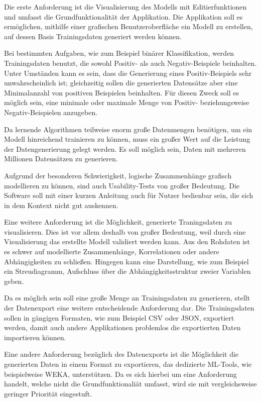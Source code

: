 Die erste Anforderung ist die Visualisierung des Modells mit Editierfunktionen und umfasst die Grundfunktionalität der Applikation. Die Applikation soll es ermöglichen, mithilfe einer grafischen Benutzeroberfläche ein Modell zu erstellen, auf dessen Basis Trainingsdaten generiert werden können.

Bei bestimmten Aufgaben, wie zum Beispiel binärer Klassifikation, werden Trainingsdaten benutzt, die sowohl Positiv- als auch Negativ-Beispiele beinhalten. Unter Umständen kann es sein, dass die Generierung eines Positiv-Beispiels sehr unwahrscheinlich ist; gleichzeitig sollen die generierten Datensätze aber eine Minimalanzahl von positiven Beispielen beinhalten. Für diesen Zweck soll es möglich sein, eine minimale oder maximale Menge von Positiv- beziehungsweise Negativ-Beispielen anzugeben.

Da lernende Algorithmen teilweise enorm große Datenmengen benötigen, um ein Modell hinreichend trainieren zu können, muss ein großer Wert auf die Leistung der Datengenerierung gelegt werden. Es soll möglich sein, Daten mit mehreren Millionen Datensätzen zu generieren.

Aufgrund der besonderen Schwierigkeit, logische Zusammenhänge grafisch modellieren zu können, sind auch Usability-Tests von großer Bedeutung. Die Software soll mit einer kurzen Anleitung auch für Nutzer bedienbar sein, die sich in dem Kontext nicht gut auskennen.

Eine weitere Anforderung ist die Möglichkeit, generierte Traningsdaten zu visualisieren. Dies ist vor allem deshalb von großer Bedeutung, weil durch eine Visualisierung das erstellte Modell validiert werden kann. Aus den Rohdaten ist es schwer auf modellierte Zusammenhänge, Korrelationen oder andere Abhängigkeiten zu schließen. Hingegen kann eine Darstellung, wie zum Beispiel ein Streudiagramm, Aufschluss über die Abhängigkeitsstruktur zweier Variablen geben.

Da es möglich sein soll eine große Menge an Trainingsdaten zu generieren, stellt der Datenexport eine weitere entscheidende Anforderung dar. Die Trainingsdaten sollen in gängigen Formaten, wie zum Beispiel \ac{CSV} oder JSON, exportiert werden, damit auch andere Applikationen problemlos die exportierten Daten importieren können.

Eine andere Anforderung bezüglich des Datenexports ist die Möglichkeit die generierten Daten in einem Format zu exportieren, das dedizierte \ac{ML}-Tools, wie beispielweise WEKA, unterstützen. Da es sich hierbei um eine Anforderung handelt, welche nicht die Grundfunktionaliät umfasst, wird sie mit vergleichsweise geringer Priorität eingestuft.

